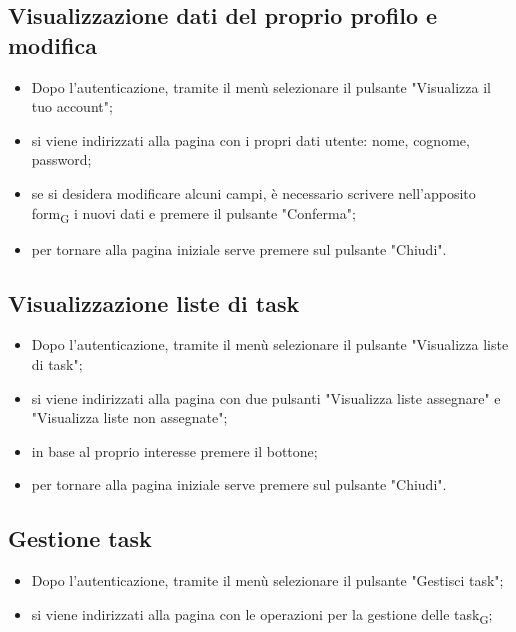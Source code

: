 \subsection{Visualizzazione dati del proprio profilo e modifica}
\begin{itemize}
    \item Dopo l'autenticazione, tramite il menù selezionare il pulsante "Visualizza il tuo account";
    \item si viene indirizzati alla pagina con i propri dati utente: nome, cognome, password;
    \item se si desidera modificare alcuni campi, è necessario scrivere nell'apposito form\textsubscript{G} i nuovi dati e premere il pulsante "Conferma";
    \item per tornare alla pagina iniziale serve premere sul pulsante "Chiudi".
\end{itemize}

\subsection{Visualizzazione liste di task}
\begin{itemize}
    \item Dopo l'autenticazione, tramite il menù selezionare il pulsante "Visualizza liste di task";
    \item si viene indirizzati alla pagina con due pulsanti "Visualizza liste assegnare" e "Visualizza liste non assegnate";
    \item in base al proprio interesse premere il bottone;
    \item per tornare alla pagina iniziale serve premere sul pulsante "Chiudi".
\end{itemize}

\subsection{Gestione task}
\begin{itemize}
    \item Dopo l'autenticazione, tramite il menù selezionare il pulsante "Gestisci task";
    \item si viene indirizzati alla pagina con le operazioni per la gestione delle task\textsubscript{G};
\end{itemize}
